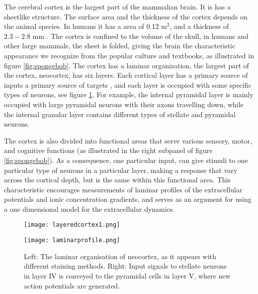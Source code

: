\documentclass{article}
\begin{document}
The cerebral cortex is the largest part of the mammalian brain. It is has a sheetlike structure. The surface area and the thickness of the cortex depends on the animal species. In humans it has a area of 0.12 m$^2$, and a thickness of $2.3 - 2.8$ mm \cite{wikipedia}. The cortex is confined to the volume of the skull, in humans and other large mammals, the sheet is folded, giving the brain the characteristic appearance we recognize from the popular culture and textbooks, as illustrated in figure  \ref{fig:spongebob}.  The cortex has a laminar organization, the largest part of the cortex, neocortex, has six layers. Each cortical layer has a primary source of inputs a primary source of targets \cite{Neuroscience}, and each layer is occupied with some specific types of neurons, see figure \ref{fig:laminarcortex}. For example, the internal pyramidal layer is mainly occupied with large pyramidal neurons with their axons travelling down, while the  internal granular layer contains different types of stellate and pyramidal neurons. 

The cortex is also divided into functional areas that serve various sensory, motor, and cognitive functions (as illustrated in the right subpanel of figure \ref{fig:spongebob}). As a consequence, one particular input, can give stimuli to one particular type of neurons in a particular layer, making a response that vary across the cortical depth, but is the same within this functional area. This characteristic encourages measurements of laminar profiles of the extracellular potentials and ionic concentration gradients, and serves as an argument for using a one dimensional model for the extracellular dynamics. 



\begin{figure}[!tbp]
  \centering
  \begin{minipage}[b]{0.45\textwidth}
    \texttt{[image: layeredcortex1.png]}
  \end{minipage}
  \begin{minipage}[b]{0.45\textwidth}
    \texttt{[image: laminarprofile.png]}
  \end{minipage}  
   \caption{Left: The laminar organisation of neocortex, as it appears with different staining methods. Right: Input signals to stellate neurons in layer IV is conveyed to the pyramidal cells in layer V, where new action potentials are generated.}
  \label{fig:laminarcortex}
\end{figure}
\end{document}
